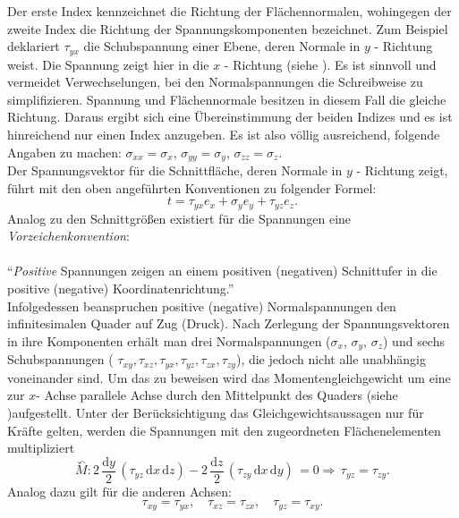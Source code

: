 \documentclass[12pt,a4paper,parskip,twoside,BCOR5mm,headsepline]{scrartcl}
\begin{document}
\begin{description*}
\begin{itemize*}
Der erste Index kennzeichnet die Richtung der Flächennormalen, wohingegen der zweite Index die Richtung der Spannungskomponenten bezeichnet. Zum Beispiel deklariert $ \tau_{yx} $ die Schubspannung einer Ebene, deren Normale in $y$ - Richtung weist. Die Spannung zeigt hier in die $ x $ - Richtung (siehe ). Es ist sinnvoll und vermeidet Verwechselungen,  bei den Normalspannungen die Schreibweise zu simplifizieren. Spannung und Flächennormale besitzen in diesem Fall die gleiche Richtung. Daraus ergibt sich eine Übereinstimmung der beiden Indizes und es ist hinreichend nur einen Index anzugeben. Es ist also völlig ausreichend,   folgende Angaben zu machen: $ \sigma_{xx} = \sigma_{x} $, $ \sigma_{yy} = \sigma_y $, $ \sigma_{zz} = \sigma_z $.\\
Der Spannungsvektor für die Schnittfläche, deren Normale in $ y $ - Richtung zeigt, führt mit den oben angeführten Konventionen zu folgender Formel:
\begin{equation}
t = \tau_{yx}e_x + \sigma_ye_y + \tau_{yz}e_z
.\end{equation}
Analog zu den Schnittgrößen existiert für die Spannungen eine \emph{Vorzeichenkonvention}:\\\\
"`\emph{Positive} Spannungen zeigen an einem positiven (negativen) Schnittufer in die positive (negative) Koordinatenrichtung."' \autocite[45]{tmr}\\
Infolgedessen beanspruchen positive (negative) Normalspannungen den infinitesimalen Quader auf Zug (Druck). Nach Zerlegung der Spannungsvektoren in ihre Komponenten erhält man drei Normalspannungen ($ \sigma_x$, $ \sigma_y $, $ \sigma_z $) und sechs Schubspannungen ( $ \tau_{xy}, \tau_{xz}, \tau_{yx}, \tau_{yz}, \tau_{zx}, \tau_{zy} $), die jedoch nicht alle unabhängig voneinander sind. Um das zu beweisen wird das Momentengleichgewicht um eine zur $x$- Achse parallele Achse durch den Mittelpunkt des Quaders (siehe )aufgestellt. Unter der Berücksichtigung das Gleichgewichtsaussagen nur für Kräfte gelten, werden die Spannungen mit den zugeordneten Flächenelementen multipliziert
\begin{equation}
\overset{\curvearrowleft}{M}: 2\,\frac{\text{d}y}{2}\,(\tau_{yz}\,\text{d}x\,\text{d}z) - 2\,\frac{\text{d}z}{2}\,(\tau_{zy}\, \text{d}x\,\text{d}y)\,= 0 \Rightarrow\,\tau_{yz} = \tau_{zy}
.\end{equation} Analog dazu gilt für die anderen Achsen: \begin{equation}
\tau_{xy}=\tau_{yx},\quad\tau_{xz}=\tau_{zx},\quad\tau_{yz}=\tau_{xy}
.\end{equation}


\end{itemize*}
\end{description*}
\end{document}
